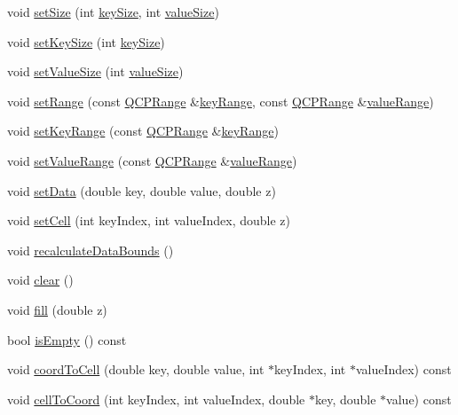 \begin{DoxyCompactItemize}
\item 
void \hyperlink{classQCPColorMapData_a0d9ff35c299d0478b682bfbcdd9c097e}{set\+Size} (int \hyperlink{classQCPColorMapData_aa8d7811686fdfea964947715210c4af8}{key\+Size}, int \hyperlink{classQCPColorMapData_ab880be6bc587f34e8d22fe77ef6b57e9}{value\+Size})
\item 
void \hyperlink{classQCPColorMapData_ac7ef70e383aface34b44dbde49234b6b}{set\+Key\+Size} (int \hyperlink{classQCPColorMapData_aa8d7811686fdfea964947715210c4af8}{key\+Size})
\item 
void \hyperlink{classQCPColorMapData_a0893c9e3914513048b45e3429ffd16f2}{set\+Value\+Size} (int \hyperlink{classQCPColorMapData_ab880be6bc587f34e8d22fe77ef6b57e9}{value\+Size})
\item 
void \hyperlink{classQCPColorMapData_aad9c1c7c703c1339489fc730517c83d4}{set\+Range} (const \hyperlink{classQCPRange}{Q\+C\+P\+Range} \&\hyperlink{classQCPColorMapData_a4765180639742460f64ab6c97c745c08}{key\+Range}, const \hyperlink{classQCPRange}{Q\+C\+P\+Range} \&\hyperlink{classQCPColorMapData_a025be4d7ba0494fd7b38a5a56c737f2a}{value\+Range})
\item 
void \hyperlink{classQCPColorMapData_a0738c485f3c9df9ea1241b7a8bb6a86e}{set\+Key\+Range} (const \hyperlink{classQCPRange}{Q\+C\+P\+Range} \&\hyperlink{classQCPColorMapData_a4765180639742460f64ab6c97c745c08}{key\+Range})
\item 
void \hyperlink{classQCPColorMapData_ada1b2680ba96a5f4175b6d341cf75d23}{set\+Value\+Range} (const \hyperlink{classQCPRange}{Q\+C\+P\+Range} \&\hyperlink{classQCPColorMapData_a025be4d7ba0494fd7b38a5a56c737f2a}{value\+Range})
\item 
void \hyperlink{classQCPColorMapData_afd2083ccfd6987ec94aa7ef8e91ca39a}{set\+Data} (double key, double value, double z)
\item 
void \hyperlink{classQCPColorMapData_a8e75eaf8746596319032a93f3d2d0683}{set\+Cell} (int key\+Index, int value\+Index, double z)
\item 
void \hyperlink{classQCPColorMapData_ab235ade8a4d64bd3adb26a99b3dd57ee}{recalculate\+Data\+Bounds} ()
\item 
void \hyperlink{classQCPColorMapData_a9910ba830e96955bd5c8e5bef1e77ef3}{clear} ()
\item 
void \hyperlink{classQCPColorMapData_a350f783260eb9b5de5c7b5e0d5d3e3c2}{fill} (double z)
\item 
bool \hyperlink{classQCPColorMapData_a986009324aee1fc5f696db46bd03dde5}{is\+Empty} () const 
\item 
void \hyperlink{classQCPColorMapData_a26e33c5ec7094b60136350bcd77d3737}{coord\+To\+Cell} (double key, double value, int $\ast$key\+Index, int $\ast$value\+Index) const 
\item 
void \hyperlink{classQCPColorMapData_ac96d6e84befe7b9951b5da6d4d4a2a47}{cell\+To\+Coord} (int key\+Index, int value\+Index, double $\ast$key, double $\ast$value) const 
\end{DoxyCompactItemize}
